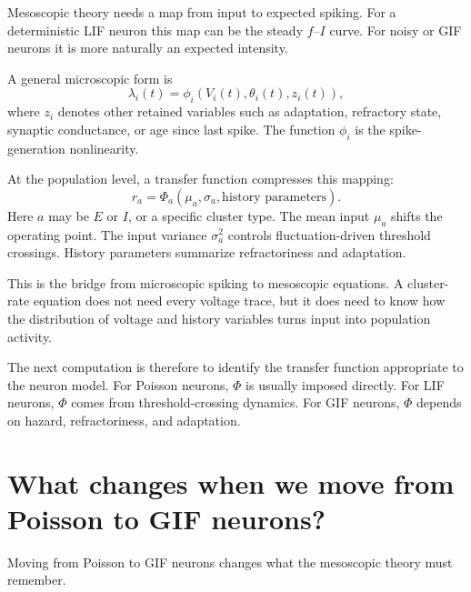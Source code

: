 Mesoscopic theory needs a map from input to expected spiking. For a deterministic LIF neuron this map can be the steady $f$--$I$ curve. For noisy or GIF neurons it is more naturally an expected intensity.

A general microscopic form is
%
\begin{equation}
  \lambda_i(t)
  =
  \phi_i\!\left(
    V_i(t),
    \theta_i(t),
    z_i(t)
  \right),
  \label{eq:general-membrane-to-intensity}
\end{equation}
%
where $z_i$ denotes other retained variables such as adaptation, refractory state, synaptic conductance, or age since last spike. The function $\phi_i$ is the spike-generation nonlinearity.

At the population level, a transfer function compresses this mapping:
%
\begin{equation}
  r_a
  =
  \Phi_a(\mu_a,\sigma_a,\text{history parameters}).
  \label{eq:population-transfer-function-ch03}
\end{equation}
%
Here $a$ may be $E$ or $I$, or a specific cluster type. The mean input $\mu_a$ shifts the operating point. The input variance $\sigma_a^2$ controls fluctuation-driven threshold crossings. History parameters summarize refractoriness and adaptation.

This is the bridge from microscopic spiking to mesoscopic equations. A cluster-rate equation does not need every voltage trace, but it does need to know how the distribution of voltage and history variables turns input into population activity.

The next computation is therefore to identify the transfer function appropriate to the neuron model. For Poisson neurons, $\Phi$ is usually imposed directly. For LIF neurons, $\Phi$ comes from threshold-crossing dynamics. For GIF neurons, $\Phi$ depends on hazard, refractoriness, and adaptation.

\section{What changes when we move from Poisson to GIF neurons?}
\label{sec:poisson-to-gif}

Moving from Poisson to GIF neurons changes what the mesoscopic theory must remember.

